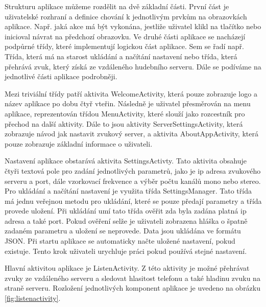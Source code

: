 \documentclass[journal, a4paper]{IEEEtran}
\begin{document}
Strukturu aplikace můžeme rozdělit na dvě základní části. První část je uživatelské rozhraní a definice chování k jednotlivým prvkům na obrazovkách aplikace. Např. jaká akce má být vykonána, jestliže uživatel klikl na tlačítko nebo inicioval návrat na předchozí obrazovku. Ve druhé části aplikace se nacházejí podpůrné třídy, které implementují logickou část aplikace. Sem se řadí např. Třída, která má na starost ukládání a načítání nastavení nebo třída, která přehrává zvuk, který získá ze vzdáleného hudebního serveru. Dále se podíváme na jednotlivé části aplikace podrobněji. \par
Mezi triviální třídy patří aktivita WelcomeActivity, která pouze zobrazuje logo a název aplikace po dobu čtyř vteřin. Následně je uživatel přesměrován na menu aplikace, reprezentován třídou MenuActivity, které slouží jako rozcestník pro přechod na další aktivity. Dále to jsou aktivity ServerSettingsActivity, která zobrazuje návod jak nastavit zvukový server, a aktivita AboutAppActivity, která pouze zobrazuje základní informace o uživateli. \par
Nastavení aplikace obstarává aktivita SettingsActivty. Tato aktivita obsahuje čtyři textová pole pro zadání jednotlivých parametrů, jako je ip adresa zvukového serveru a port, dále vzorkovací frekvence a výběr počtu kanálů mono nebo stereo. Pro ukládání a načítání nastavení je využita třída SettingsManager. Tato třída má jednu veřejnou metodu pro ukládání, které se pouze předají parametry a třída provede uložení. Při ukládání umí tato třída ověřit zda byla zadána platná ip adresa a také port. Pokud ověření selže je uživateli zobrazena hláška o špatně zadaném parametru a uložení se neprovede. Data jsou ukládána ve formátu JSON. Při startu aplikace se automaticky načte uložené nastavení, pokud existuje. Tento krok uživateli urychluje práci pokud používá stejné nastavení. \par
Hlavní aktivitou aplikace je ListenActivity. Z této aktivity je možné přehrávat zvuky ze vzdáleného serveru a sledovat hlasitost telefonu a také hladinu zvuku na straně serveru. Rozložení jednotlivých komponent aplikace je uvedeno na obrázku \ref{fig:listenactivity}.
\end{document}
